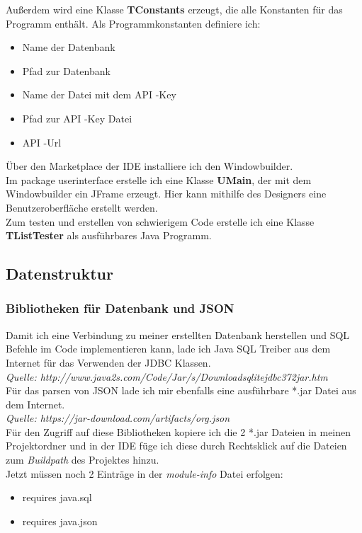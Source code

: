 Außerdem wird eine Klasse \textbf{TConstants} erzeugt, die alle Konstanten für das Programm enthält. Als Programmkonstanten definiere ich:
\begin{itemize}
\item{Name der Datenbank}
\item{Pfad zur Datenbank}
\item{Name der Datei mit dem API -Key}
\item{Pfad zur API -Key Datei}
\item{API -Url}
\end{itemize}

Über den Marketplace der IDE installiere ich den Windowbuilder.\\
Im package userinterface erstelle ich eine Klasse \textbf{UMain}, der mit dem Windowbuilder ein JFrame erzeugt. Hier kann mithilfe des Designers eine Benutzeroberfläche erstellt werden.\\
Zum testen und erstellen von schwierigem Code erstelle ich eine Klasse \textbf{TListTester} als ausführbares Java Programm.

\subsection{Datenstruktur}
\subsubsection{Bibliotheken für Datenbank und JSON}
Damit ich eine Verbindung zu meiner erstellten Datenbank herstellen und SQL Befehle im Code implementieren kann, lade ich Java SQL Treiber aus dem Internet für das Verwenden der JDBC Klassen. \\
\textit{Quelle: http://www.java2s.com/Code/Jar/s/Downloadsqlitejdbc372jar.htm} \\
Für das parsen von JSON lade ich mir ebenfalls eine ausführbare *.jar Datei aus dem Internet.\\
\textit{Quelle: https://jar-download.com/artifacts/org.json}\\
Für den Zugriff auf diese Bibliotheken kopiere ich die 2 *.jar Dateien in meinen Projektordner und in der IDE füge ich diese durch Rechtsklick auf die Dateien zum \textit{Buildpath} des Projektes hinzu.\\
Jetzt müssen noch 2 Einträge in der \textit{module-info} Datei erfolgen:
\begin{itemize}
\item{requires java.sql}
\item{requires java.json}
\end{itemize}
